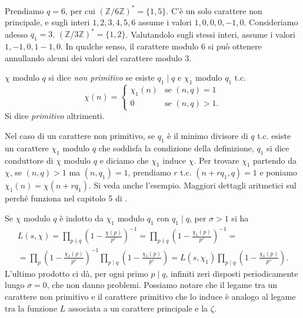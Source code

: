 \begin{ex}
  Prendiamo $q=6$, per cui $(\mathbb{Z}/6 \mathbb{Z})^*=\{1,5\}$. C'è un solo carattere non principale, e sugli interi $1,2,3,4,5,6$ assume i valori $1,0,0,0,-1,0$. Consideriamo adesso $q_1=3$. $(\mathbb{Z}/3 \mathbb{Z})^*=\{1,2\}$.
  Valutandolo sugli stessi interi, assume i valori $1,-1,0,1-1,0$. In qualche senso, il carattere modulo $6$ si può ottenere annullando alcuni dei valori del carattere modulo $3$.
\end{ex}

\begin{defn}
  $\chi$ modulo $q$ si dice \textit{non primitivo} se esiste $q_1 \mid q$ e $\chi_1$ modulo $q_1$ t.c.
  $$\chi(n)=\begin{cases}
    \chi_1(n) &\mbox{se }(n,q)=1 \\
    0 &\mbox{se }(n,q)>1.
\end{cases}$$
Si dice \textit{primitivo} altrimenti.
\end{defn}

Nel caso di un carattere non primitivo, se $q_1$ è il minimo divisore di $q$ t.c. esiste un carattere $\chi_1$ modulo $q$ che soddisfa la condizione della definizione, $q_1$ si dice conduttore di $\chi$ modulo $q$ e diciamo che $\chi_1$ induce $\chi$. Per trovare $\chi_1$ partendo da $\chi$, se $(n,q)>1$ ma $(n,q_1)=1$, prendiamo $r$ t.c. $(n+rq_1,q)=1$ e poniamo $\chi_1(n)=\chi(n+rq_1)$. Si veda anche l'esempio. Maggiori dettagli aritmetici sul perché funziona nel capitolo 5 di \cite{D}.

\begin{oss}
  Se $\chi$ modulo $q$ è indotto da $\chi_1$ modulo $q_1$ con $q_1 \mid q$, per $\sigma>1$ si ha
  \begin{gather*}
    L(s,\chi)=\prod_{p\nmid q} \left(1-\frac{\chi(p)}{p^s}\right)^{-1}=\prod_{p\nmid q}\left(1-\frac{\chi_1(p)}{p^s}\right)^{-1}=\\
    =\prod_p \left(1-\frac{\chi_1(p)}{p^s}\right)^{-1}\prod_{p\mid q} \left(1-\frac{\chi_1(p)}{p^s}\right)=L(s,\chi_1)\prod_{p\mid q} \left(1-\frac{\chi_1(p)}{p^s}\right).
  \end{gather*}
  L'ultimo prodotto ci dà, per ogni primo $p \mid q$, infiniti zeri disposti periodicamente lungo $\sigma=0$, che non danno problemi. Possiamo notare che il legame tra un carattere non primitivo e il carattere primitivo che lo induce è analogo al legame tra la funzione $L$ associata a un carattere principale e la $\zeta$.
\end{oss}

